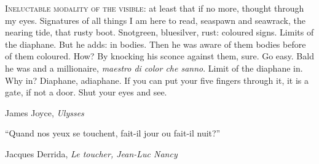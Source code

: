 \epigraph{\textsc{Ineluctable modality of the visible}: at least that if no more, thought through my eyes. Signatures of all things I am here to read, seaspawn and seawrack, the nearing tide, that rusty boot. Snotgreen, bluesilver, rust: coloured signs. Limits of the diaphane. But he adds: in bodies. Then he was aware of them bodies before of them coloured. How? By knocking his sconce against them, sure. Go easy. Bald he was and a millionaire, \emph{maestro di color che sanno}. Limit of the diaphane in. Why in? Diaphane, adiaphane. If you can put your five fingers through it, it is a gate, if not a door. Shut your eyes and see.}{James Joyce, \emph{Ulysses}}
\epigraph{``Quand nos yeux se touchent, fait-il jour ou fait-il nuit?''}{Jacques Derrida, \emph{Le toucher, Jean-Luc Nancy}}
